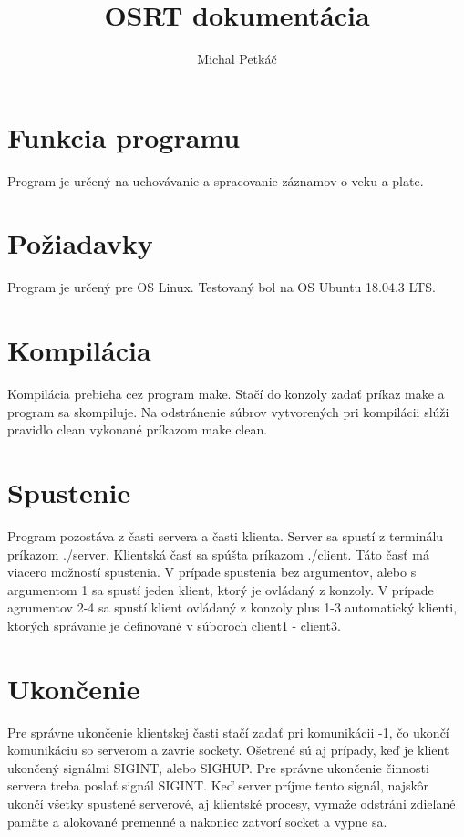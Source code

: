 \documentclass{article}
\title{OSRT dokumentácia}
\author{Michal Petkáč}
\begin{document}
\maketitle
\section{Funkcia programu}
Program je určený na uchovávanie a spracovanie záznamov o veku a plate.

\section{Požiadavky}
Program je určený pre OS Linux. Testovaný bol na OS Ubuntu 18.04.3 LTS. 

\section{Kompilácia}
Kompilácia prebieha cez program make. Stačí do konzoly zadať príkaz make a program sa skompiluje. Na odstránenie súbrov vytvorených pri kompilácii slúži pravidlo clean vykonané príkazom make clean.

\section{Spustenie}
Program pozostáva z časti servera a časti klienta. Server sa spustí z terminálu príkazom ./server. 
\newline
Klientská časť sa spúšta príkazom ./client. Táto časť má viacero možností spustenia. V prípade spustenia bez argumentov, alebo s argumentom 1 sa spustí jeden klient, ktorý je ovládaný z konzoly. V prípade agrumentov 2-4 sa spustí klient ovládaný z konzoly plus 1-3 automatický klienti, ktorých správanie je definované v súboroch client1 - client3.

\section{Ukončenie}
Pre správne ukončenie klientskej časti stačí zadať pri komunikácii -1, čo ukončí komunikáciu so serverom a zavrie sockety. Ošetrené sú aj prípady, keď je klient ukončený signálmi SIGINT, alebo SIGHUP.
\newline
Pre správne ukončenie činnosti servera treba poslať signál SIGINT. Keď server príjme tento signál, najskôr ukončí všetky spustené serverové, aj klientské procesy, vymaže odstráni zdieľané pamäte a alokované premenné a nakoniec zatvorí socket a vypne sa.
\end{document}
